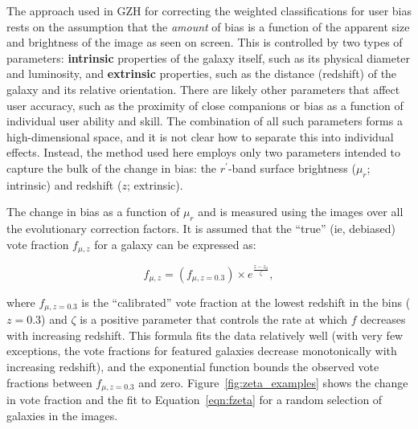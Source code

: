 \documentclass[twocolumn]{aastex6}
\begin{document}
The approach used in GZH for correcting the weighted classifications for user bias rests on the assumption that the \emph{amount} of bias is a function of the apparent size and brightness of the image as seen on screen. This is controlled by two types of parameters: \textbf{intrinsic} properties of the galaxy itself, such as its physical diameter and luminosity, and \textbf{extrinsic} properties, such as the distance (redshift) of the galaxy and its relative orientation. There are likely other parameters that affect user accuracy, such as the proximity of close companions \citep[``distraction bias''; see][]{joh15} or bias as a function of individual user ability and skill. The combination of all such parameters forms a high-dimensional space, and it is not clear how to separate this into individual effects. Instead, the method used here employs only two parameters intended to capture the bulk of the change in bias: the $r^\prime$-band surface brightness ($\mu_r$; intrinsic) and redshift ($z$; extrinsic). 

The change in bias as a function of $\mu_r$ and \zsim{} is measured using the \ferengi{} images over all the evolutionary correction factors. It is assumed that the ``true'' (ie, debiased) vote fraction $f_{\mu,z}$ for a galaxy can be expressed as:

\begin{equation}
f_{\mu,z} = \left(f_{\mu,z=0.3}\right) \times e^{{\frac{z-z_0}{\zeta}}},
\label{eqn:fzeta}
\end{equation}

\noindent where $f_{\mu,z=0.3}$ is the ``calibrated'' vote fraction at the lowest redshift in the \ferengi{} bins ($z=0.3$) and $\zeta$ is a positive parameter that controls the rate at which $f$ decreases with increasing redshift. This formula fits the data relatively well (with very few exceptions, the vote fractions for featured galaxies decrease monotonically with increasing redshift), and the exponential function bounds the observed vote fractions between $f_{\mu,z=0.3}$ and zero. Figure~\ref{fig:zeta_examples} shows the change in vote fraction and the fit to Equation~\ref{eqn:fzeta} for a random selection of galaxies in the \ferengi{} images. 
\end{document}
